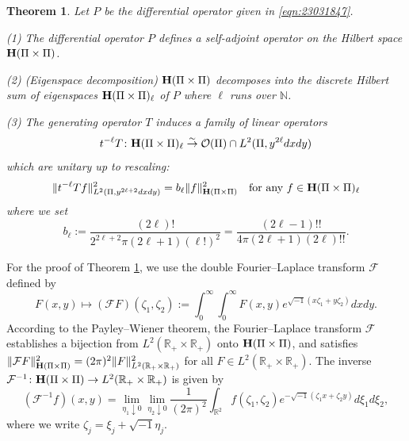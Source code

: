 \documentclass[12pt,leqno]{amsart}
\theoremstyle{plain}
\newtheorem{theorem}[thm]{Theorem}
\theoremstyle{definition}
\begin{document}
\begin{theorem}
\label{thm:Hardy}
Let $P$ be the differential operator given in \eqref{eqn:23031847}.  
\par\noindent
{\rm{(1)}}\enspace
The differential operator $P$ defines
 a self-adjoint operator
 on the Hilbert space ${\bf{H}}(\Pi \times \Pi)$.  

\par\noindent
{\rm{(2)}}\enspace
{\rm{(Eigenspace decomposition)}}\enspace
${\bf{H}}(\Pi \times \Pi)$ decomposes
 into the discrete Hilbert sum
 of eigenspaces
$
   {\bf{H}}(\Pi \times \Pi)_{\ell}
$
 of $P$ where $\ell$ runs over ${\mathbb{N}}$.  

\par\noindent
{\rm{(3)}}\enspace
The generating operator $T$ induces a family of linear operators
\[
  t^{-\ell} T \colon 
  {\bf{H}}(\Pi \times \Pi)_{\ell}
  \overset\sim \rightarrow
  {\mathcal{O}}(\Pi) \cap
  L^2(\Pi, y^{2\ell} d x d y)
\]
which are unitary up to rescaling:
\begin{equation}
\label{eqn:Tlnorm}
  \|t^{-\ell} T f\|_{L^2(\Pi, y^{2\ell+2} d x d y)}^2
  =
  b_{\ell} \|f\|_{{\bf{H}}(\Pi \times \Pi)}^2
\quad
\text{for any $f \in {\bf{H}}(\Pi \times \Pi)_{\ell}$}  
\end{equation}
where we set 
\begin{equation}
\label{eqn:23041613}
   b_{\ell}
 :=\frac{(2 \ell)!}{2^{2\ell+2} \pi (2 \ell+1)(\ell !)^2}
  =\frac{(2 \ell-1)!!}{4 \pi (2 \ell+1)(2 \ell)!!}.  
\end{equation}

\end{theorem}



For the proof of Theorem \ref{thm:Hardy}, 
 we use the double Fourier--Laplace transform
 ${\mathcal{F}}$
 defined by 
\[
  F(x,y) \mapsto ({\mathcal{F}}F)(\zeta_1, \zeta_2)
:=\int_{0}^{\infty}\int_{0}^{\infty} F(x,y)e^{\sqrt{-1}(x \zeta_1 + y \zeta_2)} d x d y.  
\]
According to the Payley--Wiener theorem, 
 the Fourier--Laplace transform ${\mathcal{F}}$ establishes a bijection from
 $L^2({\mathbb{R}}_+ \times {\mathbb{R}}_+)$
 onto ${\bf{H}}(\Pi \times \Pi)$, 
 and satisfies 
$
\|{\mathcal{F}}F\|_{{\bf{H}}(\Pi \times \Pi)}^2
=
(2\pi)^2 \|F\|_{L^2({\mathbb{R}}_+ \times {\mathbb{R}}_+)}^2
$
for all $F \in L^2({\mathbb{R}}_+ \times {\mathbb{R}}_+)$.  
The inverse 
${\mathcal{F}}^{-1} \colon {\bf{H}}(\Pi \times \Pi) \to L^2({\mathbb{R}}_+ \times {\mathbb{R}}_+)$
 is given by 
\[
   ({\mathcal{F}}^{-1}f)(x,y)
 =\lim_{\eta_1 \downarrow 0}\lim_{\eta_2 \downarrow 0}
 \frac 1 {(2\pi)^2}
 \int_{{\mathbb{R}}^2} f(\zeta_1, \zeta_2) e^{-\sqrt{-1}(\zeta_1 x+ \zeta_2 y)} d \xi_1 d \xi_2, 
\]
where we write $\zeta_j=\xi_j + \sqrt{-1} \eta_j$.  
\end{document}
